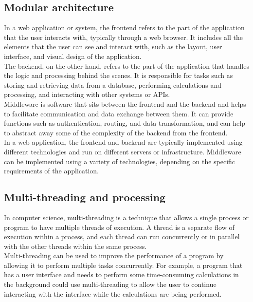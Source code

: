 \documentclass[11pt]{article}
\begin{document}
\subsection*{Modular architecture}
\label{ap:modular_architecture}
In a web application or system, the frontend refers to the part of the application that the user interacts with, typically through a web browser. 
It includes all the elements that the user can see and interact with, such as the layout, user interface, and visual design of the application.\\

The backend, on the other hand, refers to the part of the application that handles the logic and processing behind the scenes. 
It is responsible for tasks such as storing and retrieving data from a database, performing calculations and processing, and interacting with other systems or APIs.\\

Middleware is software that sits between the frontend and the backend and helps to facilitate communication and data exchange between them. 
It can provide functions such as authentication, routing, and data transformation, and can help to abstract away some of the complexity of the backend from the frontend.\\

In a web application, the frontend and backend are typically implemented using different technologies and run on different servers or infrastructure. 
Middleware can be implemented using a variety of technologies, depending on the specific requirements of the application.\\

\subsection*{Multi-threading and processing}
\label{ap:multi_threading_and_processing}
In computer science, multi-threading is a technique that allows a single process or program to have multiple threads of execution. 
A thread is a separate flow of execution within a process, and each thread can run concurrently or in parallel with the other threads within the same process.\\

Multi-threading can be used to improve the performance of a program by allowing it to perform multiple tasks concurrently. 
For example, a program that has a user interface and needs to perform some time-consuming calculations in the background could use multi-threading to allow the user to continue interacting with the interface while the calculations are being performed.\\
\end{document}
